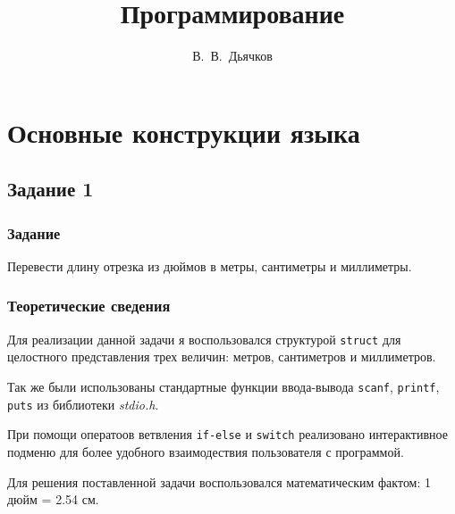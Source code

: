 \documentclass[12pt,a4paper]{report}
\author{В.~В.~Дьячков}
\title{Программирование}
\begin{document}
\listoftodos
\maketitle
\chapter{Основные конструкции языка}
\section{Задание 1}
\subsection{Задание}

Перевести длину отрезка из дюймов в метры, сантиметры и миллиметры.

\subsection{Теоретические сведения}
\hspace{\parindent}Для реализации данной задачи я воспользовался структурой \texttt{struct} для целостного представления трех величин: метров, сантиметров и миллиметров. 

Так же были использованы стандартные функции ввода-вывода \texttt{scanf}, \texttt{printf}, \texttt{puts} из библиотеки \textit{stdio.h}.

При помощи оператоов ветвления \texttt{if-else} и \texttt{switch} реализовано интерактивное подменю для более удобного взаимодествия пользователя с программой.

Для решения поставленной задачи воспользовался математическим фактом: 1 дюйм = 2.54 см.
\end{document}
